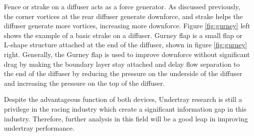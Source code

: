 \noindent Fence or strake on a diffuser acts as a force generator. As discussed previously, the corner vortices at the rear diffuser generate downforce, and strake helps the diffuser generate more vortices, increasing more downforce. Figure \ref{fig:gurney} left shows the example of a basic strake on a diffuser. Gurney flap is a small flap or L-shape structure attached at the end of the diffuser, shown in figure \ref{fig:gurney} right. Generally, the Gurney flap is used to improve downforce without significant drag \cite{Willemsen2012CFD-basedDiffuser} by making the boundary layer stay attached and delay flow separation to the end of the diffuser by reducing the pressure on the underside of the diffuser and increasing the pressure on the top of the diffuser. 

\noindent Despite the advantageous function of both devices, Undertray research is still a privilege in the racing industry which create a significant information gap in this industry. Therefore, further analysis in this field will be a good leap in improving undertray performance.  
